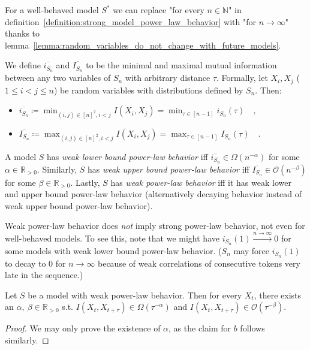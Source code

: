 \documentclass[../../main.tex]{subfiles}
\begin{document}
    \begin{corollary}
        For a well-behaved model $S^*$ we can replace "for every $n \in \mathbb{N}$" in definition~\ref{definition:strong_model_power_law_behavior} with "for $n \to \infty$" thanks to lemma~\ref{lemma:random_variables_do_not_change_with_future_models}.
    \end{corollary}

    \begin{definition}
        We define $\overline{i_{S_n}}$ and $\overline{I_{S_n}}$ to be the minimal and maximal mutual information between any two variables of $S_n$ with arbitrary distance $\tau$. Formally, let $X_i, X_j$ ($1 \leq i < j \leq n$) be random variables with distributions defined by $S_n$. Then:
        \vspace{-1em}
        \begin{itemize}
            \item $\overline{i_{S_n}} \coloneqq \min_{(i, j) \in [n]^2, i < j} I(X_i, X_j) = \min_{\tau \in [n - 1]} i_{S_n}(\tau) \quad ,$
            \item $\overline{I_{S_n}} \coloneqq \max_{(i, j) \in [n]^2, i < j} I(X_i, X_j) = \max_{\tau \in [n - 1]} I_{S_n}(\tau) \quad .$
        \end{itemize}
    \end{definition}

    \begin{definition}
        A model $S$ has \emph{weak lower bound power-law behavior} iff $\overline{i_{S_n}} \in \Omega(n^{-\alpha})$ for some $\alpha \in \mathbb{R}_{>0}$. Similarly, $S$ has \emph{weak upper bound power-law behavior} iff $\overline{I_{S_n}} \in \mathcal{O}(n^{-\beta})$ for some $\beta \in \mathbb{R}_{>0}$. Lastly, $S$ has \emph{weak power-law behavior} iff it has weak lower and upper bound power-law behavior (alternatively decaying behavior instead of weak upper bound power-law behavior).
    \end{definition}

    \begin{remark}
        Weak power-law behavior does \emph{not} imply strong power-law behavior, not even for well-behaved models. To see this, note that we might have  $i_{S_n}(1) \xrightarrow{n \to \infty} 0$ for some models with weak lower bound power-law behavior. ($S_n$ may force $i_{S_n}(1)$ to decay to $0$ for $n \to \infty$ because of weak correlations of consecutive tokens very late in the sequence.)
    \end{remark}

    \begin{proposition}
        Let $S$ be a model with weak power-law behavior. Then for every $X_t$, there exists an $\alpha, \ \beta \in \mathbb{R}_{>0}$ s.t. $I(X_{t}, X_{t + \tau}) \in \Omega(\tau^{-\alpha})$ and $I(X_{t}, X_{t + \tau}) \in \mathcal{O}(\tau^{-\beta})$.
    \end{proposition}
    \begin{proof}
        We may only prove the existence of $\alpha$, as the claim for $b$ follows similarly.
    \end{proof}
\end{document}
